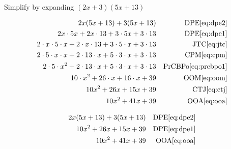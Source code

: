 \documentclass[20150903-160354-rs2.2-MarksMathNotebook.tex]{subfiles}
\begin{document}
\begin{example}[id:20141109-140659] \label{20141109-140659}  \hfill \\

Simplify by expanding $(2x+3)(5x+13)$

\soln

\solnsteps
\begin{align*}
2x(5x+13) + 3(5x+13) && \text{DPE} \eqref{eq:dpe2} \\
2x \cdot 5x + 2x \cdot 13 + 3 \cdot 5x + 3 \cdot 13 && \text{DPE} \eqref{eq:dpe1} \\
2 \cdot x \cdot 5 \cdot x + 2 \cdot x \cdot 13 + 3 \cdot 5 \cdot x + 3 \cdot 13 && \text{JTC} \eqref{eq:jtc} \\
2 \cdot 5 \cdot x \cdot x + 2 \cdot 13 \cdot x + 5 \cdot 3 \cdot x + 3 \cdot 13  && \text{CPM} \eqref{eq:cpm} \\
2 \cdot 5 \cdot x^2 + 2 \cdot 13 \cdot x + 5 \cdot 3 \cdot x + 3 \cdot 13  && \text{PrCBPo} \eqref{eq:prcbpo1} \\
10 \cdot x^2 + 26 \cdot x + 16 \cdot x + 39  && \text{OOM} \eqref{eq:oom} \\
10x^2 + 26x + 15x + 39  && \text{CTJ} \eqref{eq:ctj} \\
10x^2 + 41x + 39  && \text{OOA} \eqref{eq:ooa}
\end{align*}

\soln

\lesssteps
\begin{align*}
2x(5x+13) + 3(5x+13) && \text{DPE} \eqref{eq:dpe2} \\
10x^2+26x+15x+39 && \text{DPE} \eqref{eq:dpe1} \\
10x^2+41x+39 && \text{OOA} \eqref{eq:ooa}
\end{align*}
\end{example}
\end{document}

